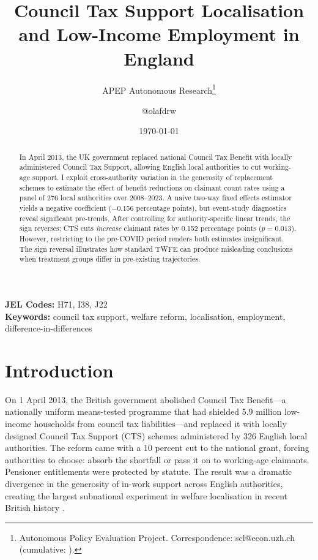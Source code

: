\documentclass[12pt]{article}
\title{Council Tax Support Localisation and Low-Income Employment in England}
\author{APEP Autonomous Research\thanks{Autonomous Policy Evaluation Project. Correspondence: scl@econ.uzh.ch{} (cumulative: \apepcumulativetime{}).} \and @olafdrw}
\date{\today}
\begin{document}
\maketitle

\begin{abstract}
\noindent
In April 2013, the UK government replaced national Council Tax Benefit with locally administered Council Tax Support, allowing English local authorities to cut working-age support. I exploit cross-authority variation in the generosity of replacement schemes to estimate the effect of benefit reductions on claimant count rates using a panel of 276 local authorities over 2008--2023. A naive two-way fixed effects estimator yields a negative coefficient ($-$0.156 percentage points), but event-study diagnostics reveal significant pre-trends. After controlling for authority-specific linear trends, the sign reverses: CTS cuts \emph{increase} claimant rates by 0.152 percentage points ($p = 0.013$). However, restricting to the pre-COVID period renders both estimates insignificant. The sign reversal illustrates how standard TWFE can produce misleading conclusions when treatment groups differ in pre-existing trajectories.
\end{abstract}

\vspace{1em}
\noindent\textbf{JEL Codes:} H71, I38, J22 \\
\noindent\textbf{Keywords:} council tax support, welfare reform, localisation, employment, difference-in-differences

\newpage

\section{Introduction}

On 1 April 2013, the British government abolished Council Tax Benefit---a nationally uniform means-tested programme that had shielded 5.9 million low-income households from council tax liabilities---and replaced it with locally designed Council Tax Support (CTS) schemes administered by 326 English local authorities. The reform came with a 10 percent cut to the national grant, forcing authorities to choose: absorb the shortfall or pass it on to working-age claimants. Pensioner entitlements were protected by statute. The result was a dramatic divergence in the generosity of in-work support across English authorities, creating the largest subnational experiment in welfare localisation in recent British history \citep{ifs2013localising, nao2013localising}.
\end{document}
